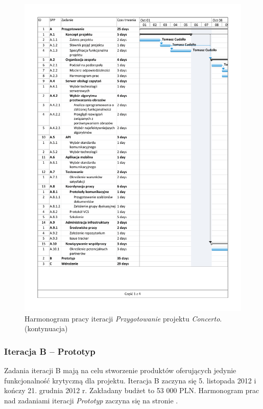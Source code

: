 \begin{figure}[p]
    \ContinuedFloat
    \includegraphics[trim=1.2cm 1.2cm 1.2cm 1.2cm,page=4,width=\textwidth]{./figury/harmonogram/harmonogram-pracy-A-przygotowanie}
    \caption[]{Harmonogram pracy iteracji \emph{Przygotowanie} projektu \emph{Concerto}. (kontynuacja)}
\end{figure}

\subsubsection{Iteracja B -- Prototyp}
Zadania iteracji B mają na celu stworzenie produktów oferujących jedynie
funkcjonalność krytyczną dla projektu. Iteracja B zaczyna się 5. listopada 2012
i kończy 21. grudnia 2012 r. Zakładany budżet to 53 000 PLN. Harmonogram prac
nad zadaniami iteracji \emph{Prototyp} zaczyna się na stronie
\pageref{fig:harmonogram:iteracja_prototyp}.

